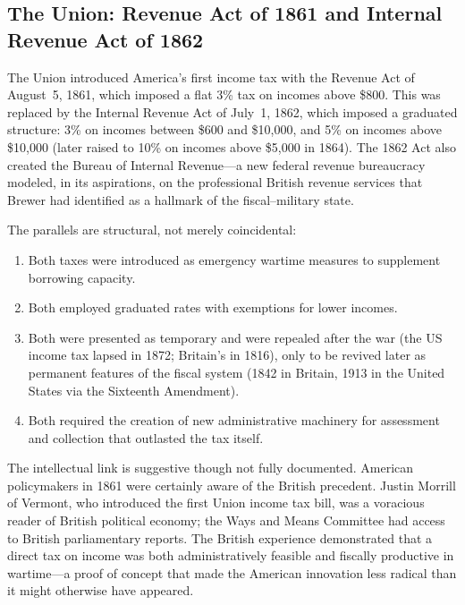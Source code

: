 \documentclass[12pt]{article}
\begin{document}
\subsection{The Union: Revenue Act of 1861 and Internal Revenue Act of 1862}

The Union introduced America's first income tax with the Revenue Act of
August~5, 1861, which imposed a flat 3\% tax on incomes above \$800.
This was replaced by the Internal Revenue Act of July~1, 1862, which
imposed a graduated structure: 3\% on incomes between \$600 and
\$10{,}000, and 5\% on incomes above \$10{,}000 (later raised to 10\%
on incomes above \$5{,}000 in 1864). The 1862 Act also created the
Bureau of Internal Revenue---a new federal revenue bureaucracy modeled,
in its aspirations, on the professional British revenue services that
Brewer had identified as a hallmark of the fiscal--military state.

The parallels are structural, not merely coincidental:

\begin{enumerate}
\item Both taxes were introduced as emergency wartime measures to
  supplement borrowing capacity.
\item Both employed graduated rates with exemptions for lower incomes.
\item Both were presented as temporary and were repealed after the war
  (the US income tax lapsed in 1872; Britain's in 1816), only to be
  revived later as permanent features of the fiscal system (1842 in
  Britain, 1913 in the United States via the Sixteenth Amendment).
\item Both required the creation of new administrative machinery for
  assessment and collection that outlasted the tax itself.
\end{enumerate}

The intellectual link is suggestive though not fully documented.
American policymakers in 1861 were certainly aware of the British
precedent. Justin Morrill of Vermont, who introduced the first Union
income tax bill, was a voracious reader of British political economy;
the Ways and Means Committee had access to British parliamentary
reports. The British experience demonstrated that a direct tax on
income was both administratively feasible and fiscally productive in
wartime---a proof of concept that made the American innovation less
radical than it might otherwise have appeared.

\end{document}
